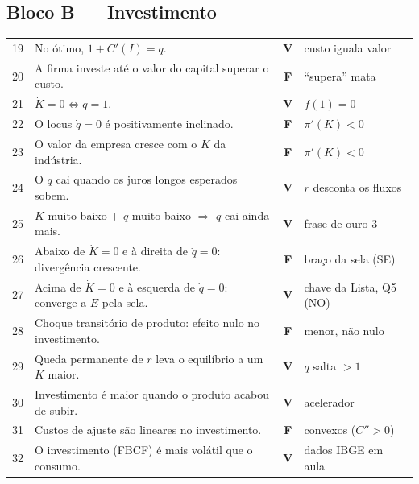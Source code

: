 \documentclass[12pt, a4paper]{article}
\newcommand{\Vok}{\textbf{\textcolor{greenbox}{V}}}
\newcommand{\Fno}{\textbf{\textcolor{redf}{F}}}
\begin{document}
\subsection*{Bloco B --- Investimento}
{\footnotesize
\renewcommand{\arraystretch}{1.3}
\begin{tabular}{p{0.5cm} p{9.2cm} c p{3.6cm}}
\toprule
19 & No ótimo, $1 + C'(I) = q$. & \Vok & custo iguala valor \\
20 & A firma investe até o valor do capital superar o custo. &
\Fno & ``supera'' mata \\
21 & $\dot K = 0 \iff q = 1$. & \Vok & $f(1) = 0$ \\
22 & O locus $\dot q = 0$ é positivamente inclinado. &
\Fno & $\pi'(K) < 0$ \\
23 & O valor da empresa cresce com o $K$ da indústria. &
\Fno & $\pi'(K) < 0$ \\
24 & O $q$ cai quando os juros longos esperados sobem. &
\Vok & $r$ desconta os fluxos \\
25 & $K$ muito baixo $+$ $q$ muito baixo $\Rightarrow$ $q$ cai ainda mais. &
\Vok & frase de ouro 3 \\
26 & Abaixo de $\dot K{=}0$ e à direita de $\dot q{=}0$: divergência
crescente. & \Fno & braço da sela (SE) \\
27 & Acima de $\dot K{=}0$ e à esquerda de $\dot q{=}0$: converge a $E$ pela
sela. & \Vok & chave da Lista, Q5 (NO) \\
28 & Choque transitório de produto: efeito nulo no investimento. &
\Fno & menor, não nulo \\
29 & Queda permanente de $r$ leva o equilíbrio a um $K$ maior. &
\Vok & $q$ salta $> 1$ \\
30 & Investimento é maior quando o produto acabou de subir. &
\Vok & acelerador \\
31 & Custos de ajuste são lineares no investimento. &
\Fno & convexos ($C''>0$) \\
32 & O investimento (FBCF) é mais volátil que o consumo. &
\Vok & dados IBGE em aula \\
\bottomrule
\end{tabular}
}
\end{document}
